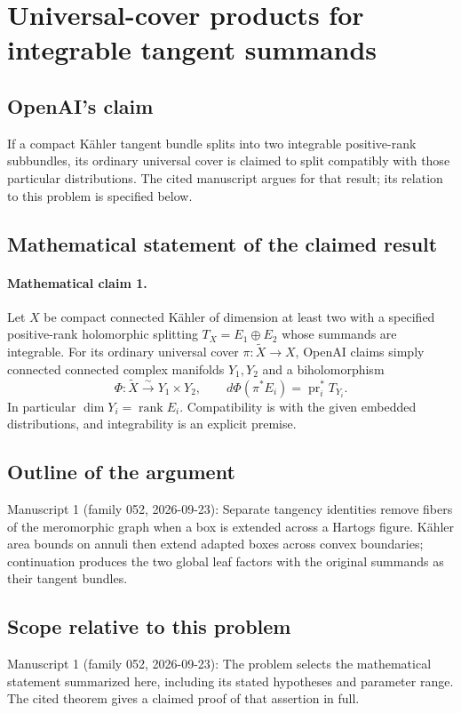 \documentclass[11pt]{article}
\begin{document}
\section*{Universal-cover products for integrable tangent summands}

\subsection{OpenAI's claim}
If a compact Kähler tangent bundle splits into two integrable positive-rank subbundles, its ordinary universal cover is claimed to split compatibly with those particular distributions. The cited manuscript argues for that result; its relation to this problem is specified below.

\subsection{Mathematical statement of the claimed result}
\paragraph{Mathematical claim 1.} Let $X$ be compact connected Kähler of dimension at least two with a specified positive-rank holomorphic splitting $T_X=E_1\oplus E_2$ whose summands are integrable. For its ordinary universal cover $\pi:\widetilde X\to X$, OpenAI claims simply connected connected complex manifolds $Y_1,Y_2$ and a biholomorphism
\[
\Phi:\widetilde X\xrightarrow{\sim}Y_1\times Y_2,\qquad
 d\Phi(\pi^*E_i)=\operatorname{pr}_i^*T_{Y_i}.
\]
In particular $\dim Y_i=\operatorname{rank}E_i$. Compatibility is with the given embedded distributions, and integrability is an explicit premise.

\subsection{Outline of the argument}
Manuscript 1 (family 052, 2026-09-23): Separate tangency identities remove fibers of the meromorphic graph when a box is extended across a Hartogs figure. Kähler area bounds on annuli then extend adapted boxes across convex boundaries; continuation produces the two global leaf factors with the original summands as their tangent bundles.

\subsection{Scope relative to this problem}
Manuscript 1 (family 052, 2026-09-23): The problem selects the mathematical statement summarized here, including its stated hypotheses and parameter range. The cited theorem gives a claimed proof of that assertion in full.
\end{document}
